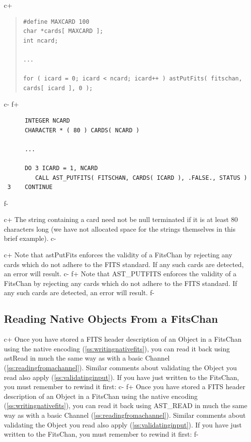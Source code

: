 \documentclass[twoside,11pt]{article}
\newcommand{\secref}[1]{\S\ref{#1}}
\renewcommand{\secref}[1]{\ref{#1}}
\begin{document}
c+
\begin{quote}
\small
\begin{verbatim}
#define MAXCARD 100
char *cards[ MAXCARD ];
int ncard;

...

for ( icard = 0; icard < ncard; icard++ ) astPutFits( fitschan, cards[ icard ], 0 );
\end{verbatim}
\normalsize
\end{quote}
c-
f+
\small
\begin{verbatim}
      INTEGER NCARD
      CHARACTER * ( 80 ) CARDS( NCARD )

      ...

      DO 3 ICARD = 1, NCARD
         CALL AST_PUTFITS( FITSCHAN, CARDS( ICARD ), .FALSE., STATUS )
 3    CONTINUE
\end{verbatim}
\normalsize
f-

c+
The string containing a card need not be null terminated if it is at
least 80 characters long (we have not allocated space for the strings
themselves in this brief example).
c-

c+
Note that astPutFits enforces the validity of a FitsChan by rejecting
any cards which do not adhere to the FITS standard. If any such cards
are detected, an error will result.
c-
f+
Note that AST\_PUTFITS enforces the validity of a FitsChan by
rejecting any cards which do not adhere to the FITS standard. If any
such cards are detected, an error will result.
f-

\subsection{\label{ss:readingnativefits}Reading Native Objects From a FitsChan}

c+
Once you have stored a FITS header description of an Object in a
FitsChan using the native encoding (\secref{ss:writingnativefits}),
you can read it back using astRead in much the same way as with a
basic Channel (\secref{ss:readingfromachannel}). Similar comments
about validating the Object you read also apply
(\secref{ss:validatinginput}).  If you have just written to the
FitsChan, you must remember to rewind it first:
c-
f+
Once you have stored a FITS header description of an Object in a
FitsChan using the native encoding (\secref{ss:writingnativefits}),
you can read it back using AST\_READ in much the same way as with a
basic Channel (\secref{ss:readingfromachannel}). Similar comments
about validating the Object you read also apply
(\secref{ss:validatinginput}).  If you have just written to the
FitsChan, you must remember to rewind it first:
f-
\end{document}

